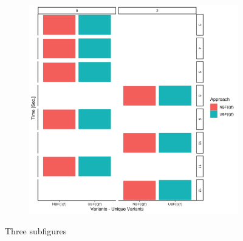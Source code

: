 \begin{figure}
\begin{subfigure}{0.5\linewidth}
\caption{}
\label{fig:sub3}
\end{subfigure}
\begin{subfigure}{0.5\linewidth}
\centering
\includegraphics[width=.7\textwidth]{figs/plots/emp-nbfif-ubfif.png}
\caption{}
\label{fig:sub4}
\end{subfigure}
\caption{Three subfigures}
\label{fig:test}
\end{figure}

